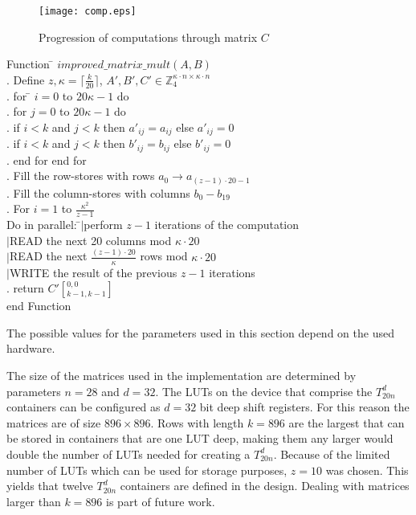 \documentclass[11pt,twoside]{article}
\begin{document}
\begin{figure}[h!]
\centering
\texttt{[image: comp.eps]}
\caption{Progression of computations through matrix $C$}
\end{figure}


\begin{tabbing}
Function \= $improved\_matrix\_mult(A,B)$ \\
. Define $z,\kappa=\lceil \frac{k}{20} \rceil$, $A',B',C' \in \mathbb{Z}_{4}^{\kappa \cdot n \times \kappa \cdot n}$ \\
. for \= $i=0$ to $20\kappa -1$ do \\
. for $j=0$ to $20\kappa -1$ do \\
\> . if $i<k$ and $j<k$ then $a'_{ij}=a_{ij}$ else $a'_{ij}=0$ \\
\> . if $i<k$ and $j<k$ then $b'_{ij}=b_{ij}$ else $b'_{ij}=0$ \\
. end for end for \\
. Fill the row-stores with rows $a_0 \rightarrow a_{(z-1)\cdot 20-1}$ \\
. Fill the column-stores with columns $b_0-b_{19}$ \\
. For $i=1$ to $\frac{\kappa^2}{z-1}$ \\
\>Do in parallel:  \=$|$perform $z-1$ iterations of the computation\\
\> \> $|$READ the next 20 columns mod $\kappa \cdot 20$\\
\> \> $|$READ the next $\frac{(z-1)\cdot 20}{\kappa}$ rows mod $\kappa \cdot 20$\\
\> \> $|$WRITE the result of the previous $z-1$ iterations\\
. return $C'[_{k-1,k-1}^{0,0}]$ \\
end Function \\
\end{tabbing}

The possible values for the parameters used in this section depend on the used hardware.

The size of the matrices used in the implementation are determined by parameters $n=28$ and $d=32$. The LUTs on the device that comprise the $T_{20n}^{d}$ containers can be configured as $d=32$ bit deep shift registers. For this reason the matrices are of size $896 \times 896$. Rows with length $k=896$ are the largest that can be stored in containers that are one LUT deep, making them any larger would double the number of LUTs needed for creating a $T_{20n}^{d}$. Because of the limited number of LUTs which can be used for storage purposes, $z=10$ was chosen. This yields that twelve $T_{20n}^{d}$ containers are defined in the design. Dealing with matrices larger than $k=896$ is part of future work.
\end{document}
